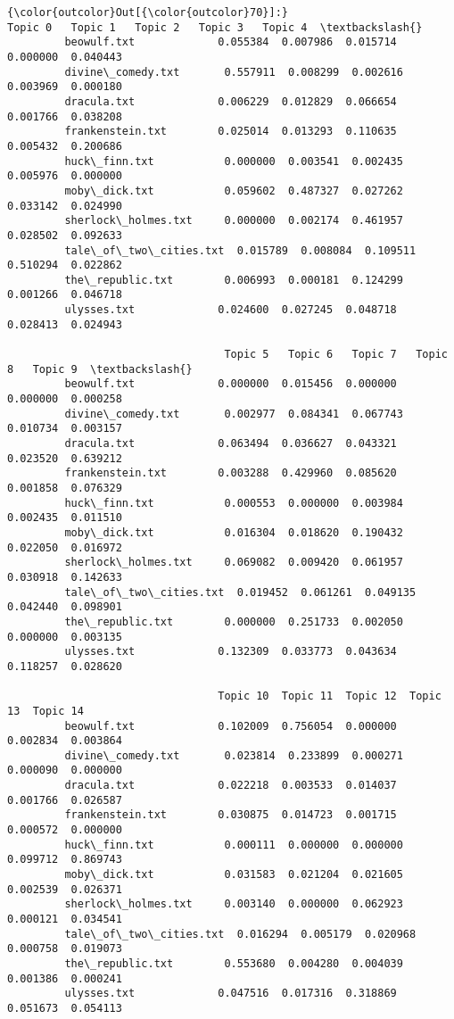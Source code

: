 \documentclass{article}
\begin{document}
            \begin{Verbatim}[commandchars=\\\{\}]
{\color{outcolor}Out[{\color{outcolor}70}]:}                          Topic 0   Topic 1   Topic 2   Topic 3   Topic 4  \textbackslash{}
         beowulf.txt             0.055384  0.007986  0.015714  0.000000  0.040443   
         divine\_comedy.txt       0.557911  0.008299  0.002616  0.003969  0.000180   
         dracula.txt             0.006229  0.012829  0.066654  0.001766  0.038208   
         frankenstein.txt        0.025014  0.013293  0.110635  0.005432  0.200686   
         huck\_finn.txt           0.000000  0.003541  0.002435  0.005976  0.000000   
         moby\_dick.txt           0.059602  0.487327  0.027262  0.033142  0.024990   
         sherlock\_holmes.txt     0.000000  0.002174  0.461957  0.028502  0.092633   
         tale\_of\_two\_cities.txt  0.015789  0.008084  0.109511  0.510294  0.022862   
         the\_republic.txt        0.006993  0.000181  0.124299  0.001266  0.046718   
         ulysses.txt             0.024600  0.027245  0.048718  0.028413  0.024943   
         
                                  Topic 5   Topic 6   Topic 7   Topic 8   Topic 9  \textbackslash{}
         beowulf.txt             0.000000  0.015456  0.000000  0.000000  0.000258   
         divine\_comedy.txt       0.002977  0.084341  0.067743  0.010734  0.003157   
         dracula.txt             0.063494  0.036627  0.043321  0.023520  0.639212   
         frankenstein.txt        0.003288  0.429960  0.085620  0.001858  0.076329   
         huck\_finn.txt           0.000553  0.000000  0.003984  0.002435  0.011510   
         moby\_dick.txt           0.016304  0.018620  0.190432  0.022050  0.016972   
         sherlock\_holmes.txt     0.069082  0.009420  0.061957  0.030918  0.142633   
         tale\_of\_two\_cities.txt  0.019452  0.061261  0.049135  0.042440  0.098901   
         the\_republic.txt        0.000000  0.251733  0.002050  0.000000  0.003135   
         ulysses.txt             0.132309  0.033773  0.043634  0.118257  0.028620   
         
                                 Topic 10  Topic 11  Topic 12  Topic 13  Topic 14  
         beowulf.txt             0.102009  0.756054  0.000000  0.002834  0.003864  
         divine\_comedy.txt       0.023814  0.233899  0.000271  0.000090  0.000000  
         dracula.txt             0.022218  0.003533  0.014037  0.001766  0.026587  
         frankenstein.txt        0.030875  0.014723  0.001715  0.000572  0.000000  
         huck\_finn.txt           0.000111  0.000000  0.000000  0.099712  0.869743  
         moby\_dick.txt           0.031583  0.021204  0.021605  0.002539  0.026371  
         sherlock\_holmes.txt     0.003140  0.000000  0.062923  0.000121  0.034541  
         tale\_of\_two\_cities.txt  0.016294  0.005179  0.020968  0.000758  0.019073  
         the\_republic.txt        0.553680  0.004280  0.004039  0.001386  0.000241  
         ulysses.txt             0.047516  0.017316  0.318869  0.051673  0.054113  
\end{Verbatim}
        
\end{document}
